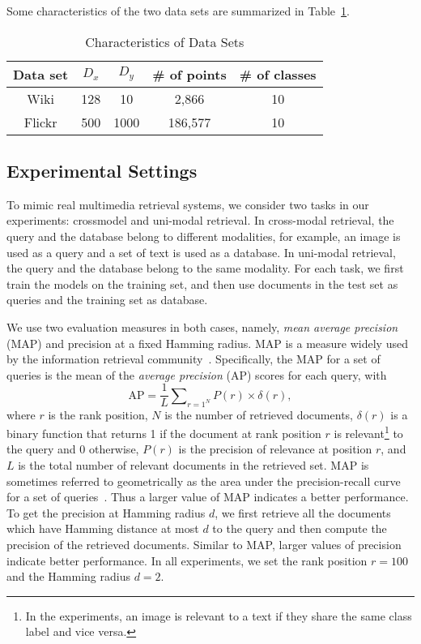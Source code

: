 Some characteristics of the two data sets are summarized in Table~\ref{table:data}.

\begin{table}[!t]
\caption{Characteristics of Data Sets}\vspace{0.5cm}
\label{table:data}
\centering
\begin{tabular}{|c|c|c|c|c|}
\hline
Data set & $D_{x}$ &  $D_{y}$ &  \# of points &\# of classes\\
\hline
Wiki& 128& 10& 2,866 & 10\\
\hline
\mbox{Flickr}& 500& 1000& 186,577 &10\\
\hline
\end{tabular}
\end{table}

\subsection{Experimental Settings}
\label{smh:exps:settings}

To mimic real multimedia retrieval systems, we consider two tasks in our experiments: crossmodel and uni-modal retrieval. In cross-modal retrieval, the query and the database belong to different modalities, for example, an image is used as a query and a set of text is used as a database. In uni-modal retrieval, the query and the database belong to the same modality. For each task, we first train the models on the training set, and then use documents in the test set as queries and the training set as database.

We use two evaluation measures in both cases, namely, \textit{mean average precision} (\mbox{MAP}) and precision at a fixed Hamming radius. \mbox{MAP} is a measure widely used by the information retrieval community~\cite{baeza1999book,rasiwasia2010mm}. Specifically, the \mbox{MAP} for a set of queries is the mean of the \textit{average precision} (\mbox{AP}) scores for each query, with
$$\textrm{AP} = \frac{1}{L}\sum\nolimits_{r=1}\nolimits^{N}P(r)\times\delta(r),$$
where $r$ is the rank position, $N$ is the number of retrieved documents, $\delta(r)$ is a binary function that returns 1 if the document at rank position $r$ is relevant\footnote{In the experiments, an image is relevant to a text if they share the same class label and vice versa.} to the query and 0 otherwise, $P(r)$ is the precision of relevance at position $r$, and $L$ is the total number of relevant documents in the retrieved set. \mbox{MAP} is sometimes referred to geometrically as the area under the precision-recall curve for a set of queries~\cite{turpin2006sigir}. Thus a larger value of \mbox{MAP} indicates a better performance. To get the precision at Hamming radius $d$, we first retrieve all the documents which have Hamming distance at most $d$ to the query and then compute the precision of the retrieved documents. Similar to \mbox{MAP}, larger values of precision indicate better performance. In all experiments, we set the rank position $r=100$ and the Hamming radius $d=2$.

